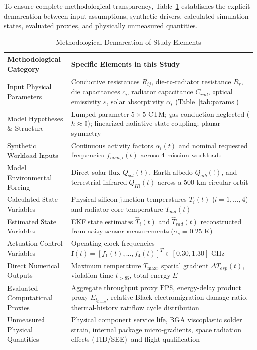 \documentclass[a4paper,fleqn]{cas-dc}
\begin{document}
To ensure complete methodological transparency, Table~\ref{tab:demarcacao} establishes the explicit demarcation between input assumptions, synthetic drivers, calculated simulation states, evaluated proxies, and physically unmeasured quantities.

\begin{table}[t]
\caption{Methodological Demarcation of Study Elements}
\label{tab:demarcacao}
\centering
\small
\begin{tabular*}{\textwidth}{@{\extracolsep{\fill}}lp{}@{}}
\toprule
\textbf{Methodological Category} & \textbf{Specific Elements in this Study} \\
\midrule
Input Physical Parameters & Conductive resistances $R_{ij}$, die-to-radiator resistance $R_r$, die capacitances $c_i$, radiator capacitance $C_{rad}$, optical emissivity $\varepsilon$, solar absorptivity $\alpha_s$ (Table~\ref{tab:params}) \\
Model Hypotheses \& Structure & Lumped-parameter $5\times5$ CTM; gas conduction neglected ($h \approx 0$); linearized radiative state coupling; planar symmetry \\
Synthetic Workload Inputs & Continuous activity factors $\alpha_i(t)$ and nominal requested frequencies $f_{nom,i}(t)$ across 4 mission workloads \\
Model Environmental Forcing & Direct solar flux $Q_{sol}(t)$, Earth albedo $Q_{alb}(t)$, and terrestrial infrared $Q_{IR}(t)$ across a 500-km circular orbit \\
Calculated State Variables & Physical silicon junction temperatures $T_i(t)$ ($i=1,\dots,4$) and radiator core temperature $T_{rad}(t)$ \\
Estimated State Variables & EKF state estimates $\hat{T}_i(t)$ and $\hat{T}_{rad}(t)$ reconstructed from noisy sensor measurements ($\sigma_s = 0.25\text{ K}$) \\
Actuation Control Variables & Operating clock frequencies $\mathbf{f}(t) = [f_1(t), \dots, f_4(t)]^T \in [0.30, 1.30]\text{ GHz}$ \\
Direct Numerical Outputs & Maximum temperature $T_{\max}$, spatial gradient $\Delta T_{esp}(t)$, violation time $t_{>85}$, total energy $E$ \\
Evaluated Computational Proxies & Aggregate throughput proxy $\mathrm{FPS}$, energy-delay product proxy $E_{t_{\mathrm{frame}}}$, relative Black electromigration damage ratio, thermal-history rainflow cycle distribution \\
Unmeasured Physical Quantities & Physical component service life, BGA viscoplastic solder strain, internal package micro-gradients, space radiation effects (TID/SEE), and flight qualification \\
\bottomrule
\end{tabular*}
\end{table}
\end{document}
